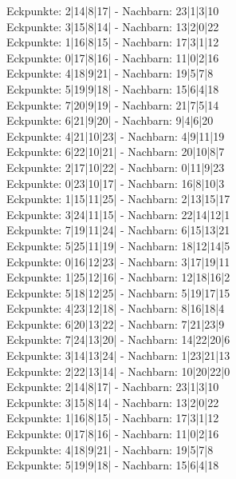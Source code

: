 \documentclass[12pt,a4paper]{scrartcl}
\begin{document}
Eckpunkte: 2|14|8|17| - Nachbarn: 23|1|3|10\\
Eckpunkte: 3|15|8|14| - Nachbarn: 13|2|0|22\\
Eckpunkte: 1|16|8|15| - Nachbarn: 17|3|1|12\\
Eckpunkte: 0|17|8|16| - Nachbarn: 11|0|2|16\\
Eckpunkte: 4|18|9|21| - Nachbarn: 19|5|7|8\\
Eckpunkte: 5|19|9|18| - Nachbarn: 15|6|4|18\\
Eckpunkte: 7|20|9|19| - Nachbarn: 21|7|5|14\\
Eckpunkte: 6|21|9|20| - Nachbarn: 9|4|6|20\\
Eckpunkte: 4|21|10|23| - Nachbarn: 4|9|11|19\\
Eckpunkte: 6|22|10|21| - Nachbarn: 20|10|8|7\\
Eckpunkte: 2|17|10|22| - Nachbarn: 0|11|9|23\\
Eckpunkte: 0|23|10|17| - Nachbarn: 16|8|10|3\\
Eckpunkte: 1|15|11|25| - Nachbarn: 2|13|15|17\\
Eckpunkte: 3|24|11|15| - Nachbarn: 22|14|12|1\\
Eckpunkte: 7|19|11|24| - Nachbarn: 6|15|13|21\\
Eckpunkte: 5|25|11|19| - Nachbarn: 18|12|14|5\\
Eckpunkte: 0|16|12|23| - Nachbarn: 3|17|19|11\\
Eckpunkte: 1|25|12|16| - Nachbarn: 12|18|16|2\\
Eckpunkte: 5|18|12|25| - Nachbarn: 5|19|17|15\\
Eckpunkte: 4|23|12|18| - Nachbarn: 8|16|18|4\\
Eckpunkte: 6|20|13|22| - Nachbarn: 7|21|23|9\\
Eckpunkte: 7|24|13|20| - Nachbarn: 14|22|20|6\\
Eckpunkte: 3|14|13|24| - Nachbarn: 1|23|21|13\\
Eckpunkte: 2|22|13|14| - Nachbarn: 10|20|22|0\\
Eckpunkte: 2|14|8|17| - Nachbarn: 23|1|3|10\\
Eckpunkte: 3|15|8|14| - Nachbarn: 13|2|0|22\\
Eckpunkte: 1|16|8|15| - Nachbarn: 17|3|1|12\\
Eckpunkte: 0|17|8|16| - Nachbarn: 11|0|2|16\\
Eckpunkte: 4|18|9|21| - Nachbarn: 19|5|7|8\\
Eckpunkte: 5|19|9|18| - Nachbarn: 15|6|4|18\\
\end{document}
